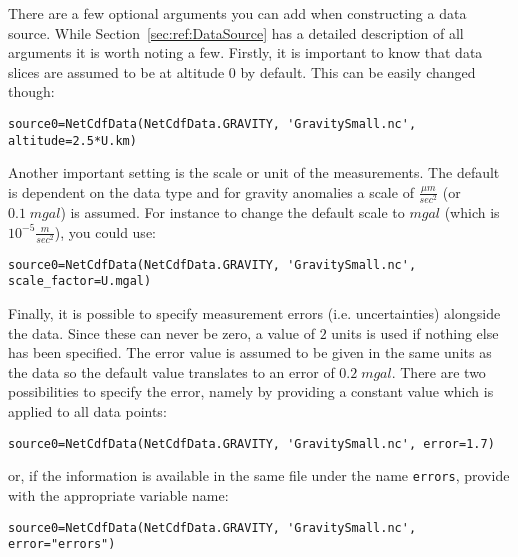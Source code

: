 There are a few optional arguments you can add when constructing a data source.
While Section~\ref{sec:ref:DataSource} has a detailed description of all
arguments it is worth noting a few.
Firstly, it is important to know that data slices are assumed to be at altitude
$0$ by default. This can be easily changed though:
\begin{verbatim}
source0=NetCdfData(NetCdfData.GRAVITY, 'GravitySmall.nc', altitude=2.5*U.km)
\end{verbatim}
Another important setting is the scale or unit of the measurements.
The default is dependent on the data type and for gravity anomalies a scale
of $\frac{\mu m}{sec^2}$ (or $0.1 \; mgal$) is assumed. For instance to 
change the default scale to $mgal$ (which is $10^{-5} \frac{m}{sec^2}$),
you could use:
\begin{verbatim}
source0=NetCdfData(NetCdfData.GRAVITY, 'GravitySmall.nc', scale_factor=U.mgal)
\end{verbatim}
Finally, it is possible to specify measurement errors (i.e. uncertainties)
alongside the data.
Since these can never be zero, a value of $2$ units is used if nothing else
has been specified.
The error value is assumed to be given in the same units as the data so the
default value translates to an error of $0.2 \; mgal$.
There are two possibilities to specify the error, namely by providing a
constant value which is applied to all data points:
\begin{verbatim}
source0=NetCdfData(NetCdfData.GRAVITY, 'GravitySmall.nc', error=1.7)
\end{verbatim}
or, if the information is available in the same \netcdf file under the name
\verb|errors|, provide \downunder with the appropriate variable name:
\begin{verbatim}
source0=NetCdfData(NetCdfData.GRAVITY, 'GravitySmall.nc', error="errors")
\end{verbatim}


